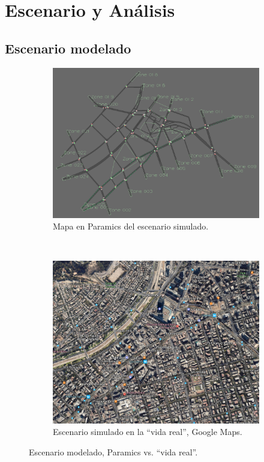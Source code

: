 \section{Escenario y Análisis}\label{sec:experiments}
\subsection{Escenario modelado}

\begin{figure}[tpb]
    \centering
    \begin{subfigure}{0.8\textwidth}
        \centering
        \includegraphics[width=\linewidth]{figuras/costanera.png}
        \caption{Mapa en Paramics del escenario simulado.}
    \end{subfigure}\\
    \begin{subfigure}{0.8\textwidth}
        \centering
        \includegraphics[width=\linewidth]{figuras/costanera_maps.png}
        \caption{Escenario simulado en la ``vida real'', Google Maps.}
    \end{subfigure}
    \caption{Escenario modelado, Paramics vs. ``vida real''.}
    \label{fig:costanera}
\end{figure}

